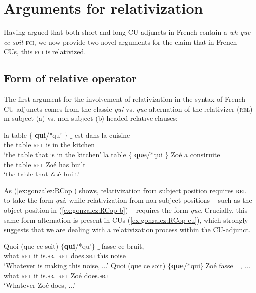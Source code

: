 \documentclass[output=paper]{langscibook}
\begin{document}
\section{Arguments for relativization}\label{sec:gonzalez:4}


Having argued that both short and long CU-adjuncts in French contain a \emph{wh que ce soit} \textsc{fci}, we now provide two novel arguments for the claim that in French CUs, this \textsc{fci} is relativized.



\subsection{Form of relative operator}

The first argument for the involvement of relativization in the syntax of French CU-adjuncts comes from the classic \emph{qui} vs. \emph{que} alternation of the relativizer (\textsc{rel}) in subject (a) vs. non-subject (b) headed relative clauses:


\ea \label{ex:gonzalez:RCop}%
\ea
\gll la table $\{$ \textbf{qui}/*qu' $\}$ $\_$ est dans la cuisine \label{ex:gonzalez:RCop-a}\\
 the table  {} \textsc{rel} {} {} is in the kitchen \\ \jambox{[subject]}
\glt `the table that is in the kitchen' 
\ex  
\gll la table $\{$ \textbf{que}/*qui $\}$ Zoé a construite $\_$ \label{ex:gonzalez:RCop-b}\\
 the table {} \textsc{rel}  {} Zoé has built \\ \jambox{[object]}
\glt `the table that Zoé built'
\z 

\z

As (\ref{ex:gonzalez:RCop}) shows, relativization from subject position requires \textsc{rel} to take the form \emph{qui}, while relativization from non-subject positions -- such as the object position in (\ref{ex:gonzalez:RCop-b}) -- requires the form \emph{que}. Crucially, this same form alternation is present in CUs (\ref{ex:gonzalez:RCop-cu}), which strongly suggests that we are dealing with a relativization process within the CU-adjunct.


\ea \label{ex:gonzalez:RCop-cu}
\ea \gll Quoi (que ce soit) $\{$\textbf{qui}/*qu'$\}$ $\_$ fasse ce bruit, \\
 what \textsc{rel} it is.\textsc{sbj}  \textsc{rel}  {} does.\textsc{sbj} this noise \\ \jambox{[CU]}
\glt `Whatever is making this noise, ...' 
\ex
\gll Quoi (que ce soit) $\{$\textbf{que}/*qui$\}$  Zoé fasse $\_$ , ...\\
what \textsc{rel} it is.\textsc{sbj} \textsc{rel}  Zoé does.\textsc{sbj} \\ \jambox{[CU]}
\glt `Whatever Zoé does, ...' 
\z 
\end{document}
